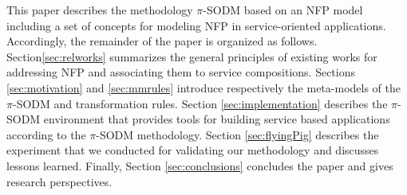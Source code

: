 
 This paper describes the methodology $\pi$-SODM based on  an NFP model including a set of concepts  for  modeling  NFP in service-oriented applications.
Accordingly, the remainder of the paper is organized as follows.
Section\ref{sec:relworks} summarizes the general principles of existing works for addressing NFP and associating them to service compositions. Sections \ref{sec:motivation}  and \ref{sec:mmrules} introduce respectively the meta-models of the $\pi$-SODM and transformation rules. Section \ref{sec:implementation} describes the $\pi$-SODM environment that provides tools for building service based applications according to the $\pi$-SODM methodology. Section \ref{sec:flyingPig} describes the experiment that we conducted for validating our methodology and discusses lessons learned. Finally, Section \ref{sec:conclusions} concludes the paper and gives research perspectives.





